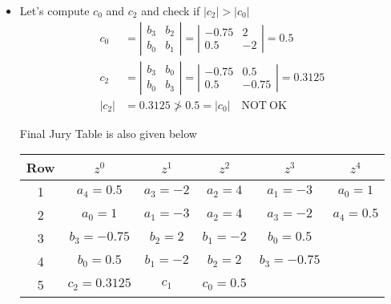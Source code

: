 \documentclass[twoside]{article}
\begin{document}
\begin{itemize}
\begin{align*}
                                                     \right| = -2
\\
b_2 &= \left| \begin{array}{cc} a_4 & a_1 \\ a_0 & a_3 \end{array}
                                                     \right| =  \left| \begin{array}{cc} 0.5 & -3 \\ 1 & -2 \end{array}
                                                     \right| = 2
\end{align*}
%
%
\item Let's compute $c_0$ and $c_2$ and check if $|c_2| > |c_0| $
%
\begin{align*}
  c_{0} &= \left| \begin{array}{cc} b_3 & b_2 \\ b_0 & b_1 \end{array}
                                                      \right| =
\left| \begin{array}{cc} -0.75 & 2 \\ 0.5 & -2 \end{array}
                                                      \right| = 0.5
\\
  c_{2} &= \left| \begin{array}{cc} b_3 & b_0 \\ b_0 & b_3 \end{array}
                                                      \right|
= \left| \begin{array}{cc} -0.75 & 0.5 \\ 0.5 & -0.75 \end{array}
                                                      \right| = 0.3125
\\
|c_2| &= 0.3125 \not> 0.5 =  |c_0| \quad \mathrm{NOT \ OK}
\end{align*}
%

Final Jury Table is also given below
%
\begin{center}
  \begin{tabular}{ | c || c c c c c |}
    \hline
    Row & $z^0$ & $z^1$ & $z^2$ & $z^3 $ & $z^4$ \\ \hline \hline
    1 & $a_4 = 0.5$ & $a_3 = -2$ & $a_2 = 4$ & $a_1 = -3$ & $a_0 = 1$ \\ \hline
    2 & $a_0 = 1$ & $a_1 = -3$ & $a_2 = 4$ & $a_3 = -2$ & $a_4 = 0.5$ \\ \hline
    3 & $b_3 = -0.75$ & $b_2 = 2$ & $b_1 = -2$ & $b_0 = 0.5$ &  \\ \hline
    4 & $b_0 = 0.5$ & $b_1 = -2$ & $b_2 = 2$ & $b_3 = -0.75$ &  \\ \hline
    5 & $c_2 = 0.3125$ & $c_1$ & $c_0 = 0.5$ &  &  \\ \hline
  \end{tabular}
\end{center}
%

\end{itemize}
%



\end{document}

